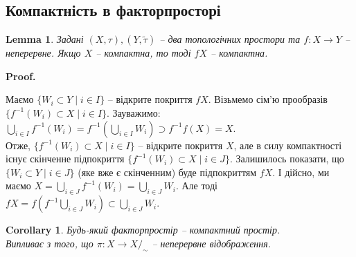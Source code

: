 \documentclass[a4paper, 10pt]{article}
\makeatletter
\theoremstyle{theoremdd}
\newtheorem{lemma}[theorem]{Lemma}
\newtheorem{corollary}[theorem]{Corollary}
\DeclareMathOperator{\Cl}{Cl}
\renewenvironment{proof}[1][Proof.\\]{\par
\pushQED{\hfill \qed}%
\normalfont \topsep6\p@\@plus6\p@\relax
\trivlist
\item\relax
{\bfseries
#1\@addpunct{.}}\hspace\labelsep\ignorespaces
}{%
\popQED\endtrivlist\@endpefalse
}
\makeatother
\begin{document}
\subsection{Компактність в факторпросторі}
\begin{lemma}
Задані $(X,\tau),(Y,\tilde{\tau})$ -- два топологічних простори та $f \colon X \to Y$ -- неперервне. Якщо $X$ -- компактна, то тоді $fX$ -- компактна.
\end{lemma}

\begin{proof}
Маємо $\{W_i \subset Y \mid i \in I\}$ -- відкрите покриття $fX$. Візьмемо сім'ю прообразів $\{f^{-1}(W_i) \subset X \mid i \in I\}$. Зауважимо:\\
$\displaystyle\bigcup_{i \in I} f^{-1}(W_i) = f^{-1} \left( \bigcup_{i \in I} W_i \right) \supset f^{-1} f(X) = X$.\\
Отже, $\{f^{-1}(W_i) \subset X \mid i \in I\}$ -- відкрите покриття $X$, але в силу компактності існує скінченне підпокриття $\{f^{-1}(W_i) \subset X \mid i \in J\}$. Залишилось показати, що $\{W_i \subset Y \mid i \in J\}$ (яке вже є скінченним) буде підпокриттям $fX$. І дійсно, ми маємо $X = \displaystyle\bigcup_{i \in J} f^{-1}(W_i) = \bigcup_{i \in J} W_i$. Але тоді \\ $fX = \displaystyle f\left( f^{-1} \bigcup_{i \in J} W_i \right) \subset \bigcup_{i \in J} W_i$.
\end{proof}

\begin{corollary}
Будь-який факторпростір -- компактний простір.\\
\textit{Випливає з того, що $\pi \colon X \to X/_\sim$ -- неперервне відображення.}
\end{corollary}
\end{document}

